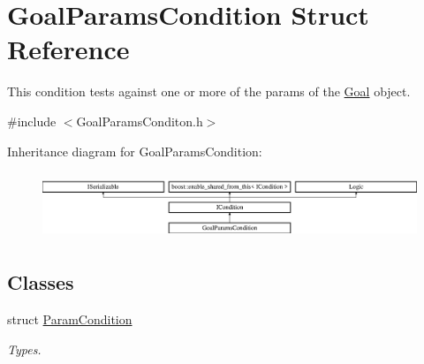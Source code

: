 \hypertarget{struct_goal_params_condition}{}\section{Goal\+Params\+Condition Struct Reference}
\label{struct_goal_params_condition}


This condition tests against one or more of the params of the \hyperlink{class_goal}{Goal} object.  




{\ttfamily \#include $<$Goal\+Params\+Conditon.\+h$>$}

Inheritance diagram for Goal\+Params\+Condition\+:\begin{figure}[H]
\begin{center}
\leavevmode
\includegraphics[height=2.014389cm]{struct_goal_params_condition}
\end{center}
\end{figure}
\subsection*{Classes}
\begin{DoxyCompactItemize}
\item 
struct \hyperlink{struct_goal_params_condition_1_1_param_condition}{Param\+Condition}
\begin{DoxyCompactList}\small\item\em Types. \end{DoxyCompactList}\end{DoxyCompactItemize}
